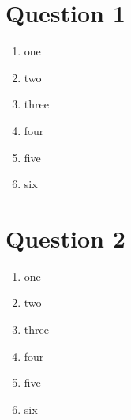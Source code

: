 \documentclass[11pt]{article}
\begin{document}

\section*{Question 1}

\begin{enumerate}[label=(\alph*)]

  \item one
  \item two
  \item three
  \item four
  \item five
  \item six

\end{enumerate}



\section*{Question 2}

\begin{enumerate}[label=(\alph*)]

  \item one
  \item two
  \item three
  \item four
  \item five
  \item six

\end{enumerate}


\end{document}
